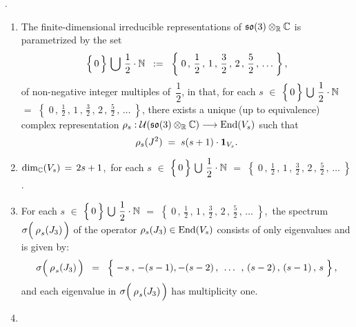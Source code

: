
\vskip 0.5cm
\begin{theorem}
{\color{white}.}\vskip -0.1cm
\noindent
\begin{enumerate}
\item
	The finite-dimensional irreducible representations of $\mathfrak{so}(3) \otimes_{\mathbb{R}} \mathbb{C}$ is parametrized by the set
	\begin{equation*}
	\left\{\,\overset{{\color{white}.}}{0}\,\right\} \,\bigcup\, \dfrac{1}{2} \cdot \N
	\;\; := \;\;
		\left\{\;0 \,,\, \dfrac{1}{2} \,,\, 1 \,,\, \frac{3}{2} \,,\, 2 \,,\, \frac{5}{2} \,,\, \ldots \;\right\},
	\end{equation*}
	of non-negative integer multiples of \,$\dfrac{1}{2}$, in that, for each
	$s$
	$\in$ $\left\{\,\overset{{\color{white}.}}{0}\,\right\} \,\bigcup\, \dfrac{1}{2} \cdot \N$
	$=$ $\left\{\; 0 \,,\, \frac{1}{2}\,,\, 1\,,\, \frac{3}{2}\,,\, 2\,,\, \frac{5}{2}\,,\, \ldots \;\right\}$,
	there exists a unique (up to equivalence) complex representation
	$\rho_{s} : \mathcal{U}(\mathfrak{so}(3)\otimes_{\mathbb{R}}\mathbb{C}) \longrightarrow \textnormal{End}(V_{s})$
	such that
	\begin{equation*}
	\rho_{s}(J^{2}) \; = \; s(s+1)\cdot\textnormal{\textbf{1}}_{V_{s}}.
	\end{equation*}
\item
	$\dim_{\mathbb{C}}(V_{s}) \, = \, 2s + 1$,\, for each
	$s$
	$\in$ $\left\{\,\overset{{\color{white}.}}{0}\,\right\} \,\bigcup\, \dfrac{1}{2} \cdot \N$
	$=$ $\left\{\; 0 \,,\, \frac{1}{2}\,,\, 1\,,\, \frac{3}{2}\,,\, 2\,,\, \frac{5}{2}\,,\, \ldots \;\right\}$.
\item
	For each
	$s$
	$\in$ $\left\{\,\overset{{\color{white}.}}{0}\,\right\} \,\bigcup\, \dfrac{1}{2} \cdot \N$
	$=$ $\left\{\; 0 \,,\, \frac{1}{2}\,,\, 1\,,\, \frac{3}{2}\,,\, 2\,,\, \frac{5}{2}\,,\, \ldots \;\right\}$,\,
	the spectrum
	$\sigma\!\left(\,\overset{{\color{white}-}}{\rho}_{s}(J_{3})\,\right)$
	of the operator $\rho_{s}(J_{3}) \in \textnormal{End}(V_{s})$
	consists of only eigenvalues and is given by:
	\begin{equation*}
	\sigma\!\left(\,\overset{{\color{white}-}}{\rho}_{s}(J_{3})\,\right)
	\;\; = \;\;
		\left\{\;
			-\overset{{\color{white}-}}{s} \,,\, -(s-1), -(s-2)
			\,,\;\, \ldots \,\;,\,
			(s-2) \,,\, (s-1) \,,\, s
			\;\right\},
	\end{equation*}
	and each eigenvalue in 
	$\sigma\!\left(\,\overset{{\color{white}-}}{\rho}_{s}(J_{3})\,\right)$
	has multiplicity one.
\item

\end{enumerate}
\end{theorem}
